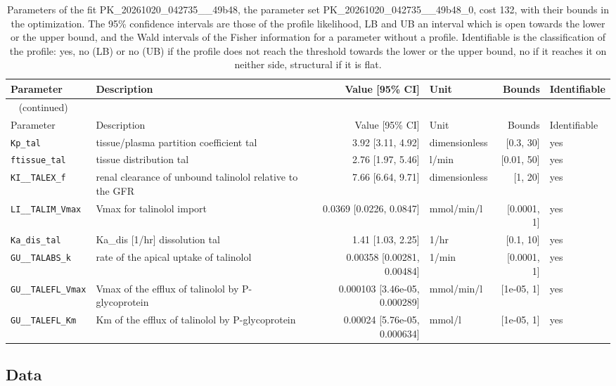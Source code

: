 \documentclass{article}
\begin{document}
\begin{longtable}{llrlrl}
\caption{Parameters of the fit PK\_20261020\_042735\_\_49b48, the parameter set PK\_20261020\_042735\_\_49b48\_0, cost 132, with their bounds in the optimization. The 95\% confidence intervals are those of the profile likelihood, LB and UB an interval which is open towards the lower or the upper bound, and the Wald intervals of the Fisher information for a parameter without a profile. Identifiable is the classification of the profile: yes, no (LB) or no (UB) if the profile does not reach the threshold towards the lower or the upper bound, no if it reaches it on neither side, structural if it is flat.}\label{tab:parameters:PK_20261020_042735__49b48} \\
\toprule
Parameter & Description & Value [95\% CI] & Unit & Bounds & Identifiable \\
\midrule
\endfirsthead
\multicolumn{6}{l}{\small\tablename~\thetable{} (continued)} \\
\toprule
Parameter & Description & Value [95\% CI] & Unit & Bounds & Identifiable \\
\midrule
\endhead
\bottomrule
\endlastfoot
\texttt{Kp\_tal} & tissue/plasma partition coefficient tal & 3.92 [3.11, 4.92] & dimensionless & [0.3, 30] & yes \\
\texttt{ftissue\_tal} & tissue distribution tal & 2.76 [1.97, 5.46] & l/min & [0.01, 50] & yes \\
\texttt{KI\_\_TALEX\_f} & renal clearance of unbound talinolol relative to the GFR & 7.66 [6.64, 9.71] & dimensionless & [1, 20] & yes \\
\texttt{LI\_\_TALIM\_Vmax} & Vmax for talinolol import & 0.0369 [0.0226, 0.0847] & mmol/min/l & [0.0001, 1] & yes \\
\texttt{Ka\_dis\_tal} & Ka\_dis [1/hr] dissolution tal & 1.41 [1.03, 2.25] & 1/hr & [0.1, 10] & yes \\
\texttt{GU\_\_TALABS\_k} & rate of the apical uptake of talinolol & 0.00358 [0.00281, 0.00484] & 1/min & [0.0001, 1] & yes \\
\texttt{GU\_\_TALEFL\_Vmax} & Vmax of the efflux of talinolol by P-glycoprotein & 0.000103 [3.46e-05, 0.000289] & mmol/min/l & [1e-05, 1] & yes \\
\texttt{GU\_\_TALEFL\_Km} & Km of the efflux of talinolol by P-glycoprotein & 0.00024 [5.76e-05, 0.000634] & mmol/l & [1e-05, 1] & yes \\
\end{longtable}

\subsection{Data}
\end{document}

